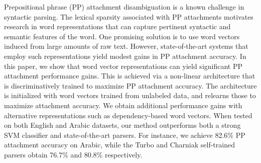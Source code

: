 Prepositional phrase (PP) attachment disambiguation is a known challenge in syntactic parsing. The lexical sparsity associated with PP attachments motivates research in word representations that can capture pertinent syntactic and semantic features of the word. One promising solution is to use word vectors induced from large amounts of raw text. However, state-of-the-art systems that employ such representations yield modest gains in PP attachment accuracy.  In this paper, we show that word vector representations can yield significant PP attachment performance gains. This is achieved via a non-linear architecture that is discriminatively trained to maximize PP attachment accuracy. The architecture is initialized with word vectors trained from unlabeled data, and relearns those to maximize attachment accuracy. We obtain additional performance gains with alternative representations such as dependency-based word vectors. When tested on both English and Arabic datasets, our method outperforms both a strong SVM classifier and state-of-the-art parsers. For instance, we achieve 82.6\% PP attachment accuracy on Arabic, while the Turbo and Charniak self-trained parsers obtain 76.7\% and 80.8\% respectively.